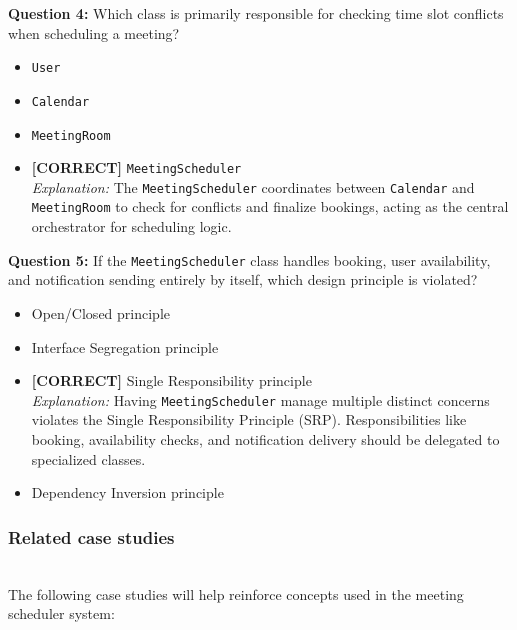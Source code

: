 \vspace{0.3cm}
\noindent
\textbf{Question 4:} Which class is primarily responsible for checking time slot conflicts when scheduling a meeting?
\\[0.2cm]
\begin{itemize}
 \item \texttt{User}
 \item \texttt{Calendar}
 \item \texttt{MeetingRoom}
 \item \textbf{[CORRECT]} \texttt{MeetingScheduler}
\\[0.1cm]
\textit{Explanation:} 
The \texttt{MeetingScheduler} coordinates between \texttt{Calendar} and \texttt{MeetingRoom} to check for conflicts and finalize bookings, acting as the central orchestrator for scheduling logic.
\end{itemize}
\vspace{0.3cm}
\noindent
\textbf{Question 5:} If the \texttt{MeetingScheduler} class handles booking, user availability, and notification sending entirely by itself, which design principle is violated?
\\[0.2cm]
\begin{itemize}
 \item Open/Closed principle
 \item Interface Segregation principle
 \item \textbf{[CORRECT]} Single Responsibility principle
\\[0.1cm]
\textit{Explanation:} 
Having \texttt{MeetingScheduler} manage multiple distinct concerns violates the Single Responsibility Principle (SRP). Responsibilities like booking, availability checks, and notification delivery should be delegated to specialized classes.
 \item Dependency Inversion principle
\end{itemize}

\subsubsection{Related case studies}\label{CJfoxAChWeg-HDZ7oPmP4}
\\
The following case studies will help reinforce concepts used in the meeting scheduler system:

